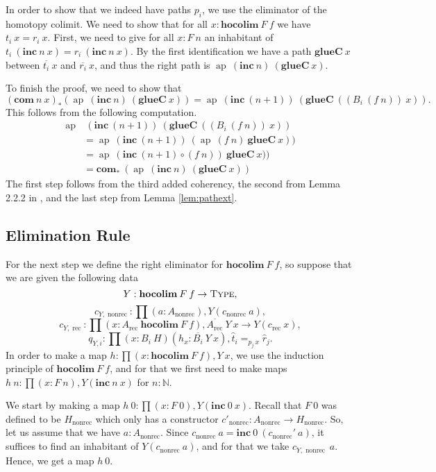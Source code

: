 \documentclass[a4paper,UKenglish]{lipics-v2016}
\newcommand{\Boperator}[1]{\mathrm{\mathbf{#1}}}
\newcommand{\rec}[0]{\operatorname{rec}}
\newcommand{\nonrec}[0]{\operatorname{nonrec}}
\newcommand{\ap}[0]{\operatorname{ap}}
\newcommand{\glueC}[0]{\Boperator{glueC}}
\newcommand{\hocolim}[0]{\Boperator{hocolim}}
\newcommand{\inc}[0]{\Boperator{inc}}
\newcommand{\com}[0]{\Boperator{com}}
\newcommand{\Type}[0]{\operatorname{\textsc{Type}}}
\newcommand{\dak}[1]{\widehat{#1}}
\newcommand{\hatt}{\dak{t}}
\newcommand{\hatr}{\dak{r}}
\begin{document}
In order to show that we indeed have paths $p_i$, we use the eliminator of the homotopy colimit.
We need to show that for all $x : \hocolim \> F \> f$ we have $t_i \> x = r_i \> x$. 
First, we need to give for all $x : F \> n$ an inhabitant of $t_i \> (\inc \> n \> x) = r_i \> (\inc \> n \> x)$.
By the first identification we have a path $\glueC \> x$ between $\overline{t_i} \> x$ and $\overline{r_i} \> x$, and thus the right path is $\ap \> (\inc \> n) \> (\glueC \> x)$. 

To finish the proof, we need to show that 
\[
(\com \> n \> x)_*(\ap \> (\inc \> n) \> (\glueC \> x)) = \ap \> (\inc \> (n+1)) \> (\glueC \> ((B_i \>(f \>n)) \> x)).
\]
This follows from the following computation.
\begin{equation*}
\begin{split}
\ap &\> (\inc \> (n+1)) \> (\glueC \> ((B_i \>(f \> n)) \> x))\\
&= \ap \> (\inc \> (n+1)) \> (\ap \> (f \> n) \>\glueC \> x))\\
&= \ap \> (\inc \> (n+1) \circ (f \> n)) \>\glueC \> x))\\
&=\com_* \> (\ap \> (\inc \> n) \> (\glueC \> x))
\end{split}
\end{equation*}
The first step follows from the third added coherency, the second from Lemma 2.2.2 in \cite{hottbook}, and the last step from Lemma \ref{lem:pathext}.


\subsection{Elimination Rule}
For the next step we define the right eliminator for $\hocolim \> F \> f$, so suppose that we are given the following data
\[
Y : \hocolim \> F \> f \rightarrow \Type,
\]
\[
c_{Y, \nonrec} : \prod (a : A_{\nonrec}), Y(c_{\nonrec} \> a),
\]
\[
c_{Y, \rec} : \prod (x : A_{\rec} \> \hocolim \> F \> f), \overline{A_{\rec}} \> Y \> x \rightarrow Y(c_{\rec} \> x),
\]
\[
q_{Y, i} : \prod (x : B_i \> H)(h_x : \overline{B_i} \> Y \> x), \hatt_i =_{p_j \, x} \hatr_j.
\]
In order to make a map $h : \prod (x : \hocolim \> F \> f), Y \> x$, we use the induction principle of $\hocolim \> F \> f$, and for that we first need to make maps $h \> n : \prod (x : F \> n), Y(\inc \> n \> x)$ for $n : \mathbb{N}$.

We start by making a map $h \> 0 : \prod (x : F \> 0), Y(\inc \> 0 \> x)$.
Recall that $F \> 0$ was defined to be $H_{\nonrec}$ which only has a constructor $c'_{\nonrec} : A_{\nonrec} \rightarrow H_{\nonrec}$.
So, let us assume that we have $a : A_{\nonrec}$.
Since $c_{\nonrec} \> a = \inc \> 0 \> (c_{\nonrec}' \> a)$, it suffices to find an inhabitant of $Y(c_{\nonrec} \> a)$, and for that we take $c_{Y, \nonrec} \> a$.
Hence, we get a map $h \> 0$.
\end{document}
